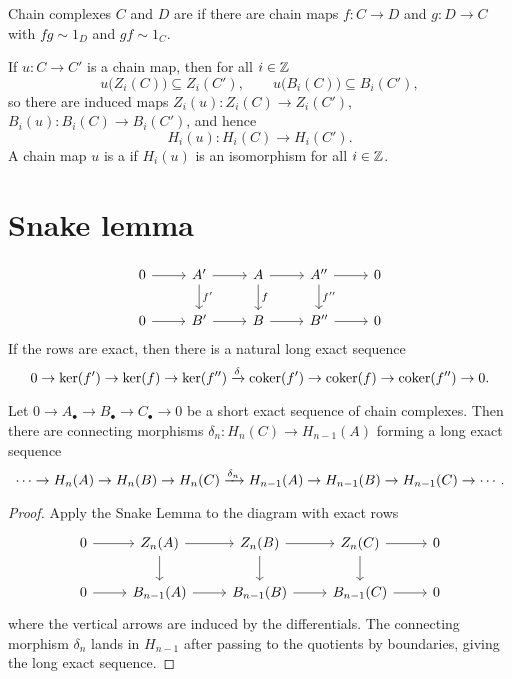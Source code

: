 \begin{definitions*}
	\item Chain complexes \( C \) and \( D \) are  if there are chain maps \( f: C \to D \) and \( g: D \to C \) with \( fg \sim 1_D \) and \( gf \sim 1_C \).
	\item If \( u: C \to C' \) is a chain map, then for all \( i \in \mathbb{Z} \)
		\[
			u\bigl(Z_i(C)\bigr) \subseteq Z_i(C'), \qquad u\bigl(B_i(C)\bigr) \subseteq B_i(C'),
		\]
		so there are induced maps \( Z_i(u): Z_i(C) \to Z_i(C') \), \( B_i(u): B_i(C) \to B_i(C') \), and hence
		\[
			H_i(u): H_i(C) \to H_i(C').
		\]
		A chain map \( u \) is a  if \( H_i(u) \) is an isomorphism for all \( i \in \mathbb{Z} \).
\end{definitions*}

\section{Snake lemma}

\begin{lemma*}
	\[
		\begin{tikzcd}
			0 \arrow[r] & A' \arrow[r] \arrow[d,"f'"] & A \arrow[r] \arrow[d,"f"] & A'' \arrow[r] \arrow[d,"f''"] & 0 \\
			0 \arrow[r] & B' \arrow[r] & B \arrow[r] & B'' \arrow[r] & 0
		\end{tikzcd}
	\]
	If the rows are exact, then there is a natural long exact sequence
	\[
		0 \to \ker(f') \to \ker(f) \to \ker(f'') \xrightarrow{\delta} \operatorname{coker}(f') \to \operatorname{coker}(f) \to \operatorname{coker}(f'') \to 0 .
	\]
\end{lemma*}

\begin{proposition*}
	Let \( 0 \to A_{\bullet} \to B_{\bullet} \to C_{\bullet} \to 0 \) be a short exact sequence of chain complexes. Then there are connecting morphisms \( \delta_n: H_n(C) \to H_{n-1}(A) \) forming a long exact sequence
	\[
		\dotsm \to H_n(A) \to H_n(B) \to H_n(C) \xrightarrow{\delta_n} H_{n-1}(A) \to H_{n-1}(B) \to H_{n-1}(C) \to \dotsm .
	\]
\end{proposition*}
\begin{proof}
	Apply the Snake Lemma to the diagram with exact rows
	\[
		\begin{tikzcd}
			0 \arrow[r] & Z_n(A) \arrow[r] \arrow[d] & Z_n(B) \arrow[r] \arrow[d] & Z_n(C) \arrow[r] \arrow[d] & 0 \\
			0 \arrow[r] & B_{n-1}(A) \arrow[r] & B_{n-1}(B) \arrow[r] & B_{n-1}(C) \arrow[r] & 0
		\end{tikzcd}
	\]
	where the vertical arrows are induced by the differentials. The connecting morphism \( \delta_n \) lands in \( H_{n-1} \) after passing to the quotients by boundaries, giving the long exact sequence.
\end{proof}

